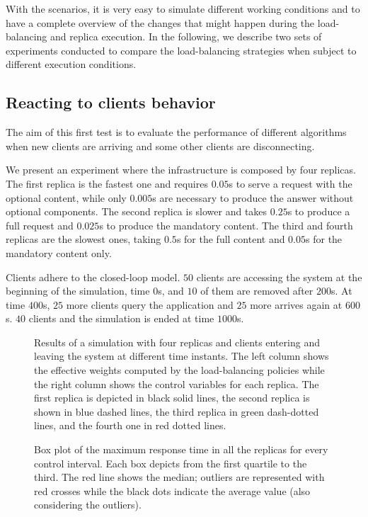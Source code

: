 With the scenarios, it is very easy to simulate different working
conditions and to have a complete overview of the changes that might
happen during the load-balancing and replica execution. In the
following, we describe two sets of experiments conducted to compare
the load-balancing strategies when subject to different execution
conditions.

\subsection{Reacting to clients behavior}

The aim of this first test is to evaluate the performance of different
algorithms when new clients are arriving and some other clients
are disconnecting.

We present an experiment where the infrastructure is composed by four
replicas. The first replica is the fastest one and requires $0.05$s
to serve a request with the optional content, while only $0.005$s
are necessary to produce the answer without optional components. The
second replica is slower and takes $0.25$s to produce a full request
and $0.025$s to produce the mandatory content. The third and
fourth replicas are the slowest ones, taking $0.5$s for the full
content and $0.05$s for the mandatory content only.

Clients adhere to the closed-loop model. $50$ clients are
accessing the system at the beginning of the simulation, time $0$s, and
$10$ of them are removed after $200$s. At time $400$s, $25$ more
clients query the application and $25$ more arrives again at $600$s.  $40$ clients and the simulation is ended at time $1000$s.

\begin{figure}
  \centering 
  \caption{Results of a simulation with four replicas and clients
    entering and leaving the system at different time instants. The left
    column shows the effective weights computed by the load-balancing
    policies while the right column shows the control variables for
    each replica. The first replica is depicted in black solid lines,
    the second replica is shown in blue dashed lines, the third
    replica in green dash-dotted lines, and the fourth one in red dotted lines.}
\label{fig:clientchanges-full}
\end{figure}

\begin{figure}
\centering

\vspace{-4mm}
\caption{Box plot of the maximum response time in all the replicas for every control interval. Each
  box depicts from the first quartile to the third. The red line shows
  the median; outliers are represented with red crosses while the
  black dots indicate the average value (also considering the outliers).}
\label{fig:clientchanges-boxplot}
\end{figure}

